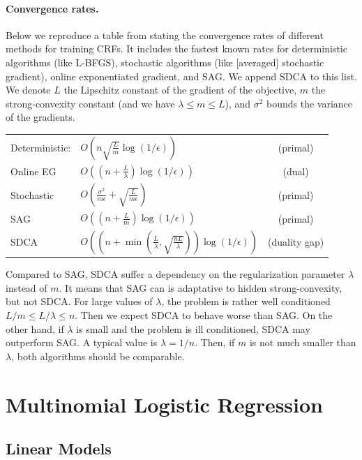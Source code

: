 \documentclass{article}
\DeclareMathOperator{\1}{\mathbb{1}}
\begin{document}
\paragraph{Convergence rates.}
Below we reproduce a table from \cite{schmidt_non-uniform_2015}stating the convergence rates of different methods for training CRFs.
It includes the fastest known rates for deterministic algorithms (like L-BFGS), stochastic algorithms (like [averaged] stochastic gradient), online exponentiated gradient, and SAG.
We append SDCA to this list.
We denote $L$ the Lipschitz constant of the gradient of the objective, $m$ the strong-convexity constant (and we have $\lambda \leq m \leq L$), and $\sigma^2$ bounds the variance of the gradients.\\
\begin{center}
\begin{tabular}{llc}
Deterministic: & $O(n\sqrt{\frac{L}{m}}\log(1/\epsilon))$ & (primal)\\
Online EG & $O((n + \frac{L}{\lambda})\log(1/\epsilon))$ & (dual)\\
Stochastic & $O(\frac{\sigma^2}{m \epsilon}+\sqrt{\frac{L}{m \epsilon}})$ & (primal)\\
SAG & $O((n + \frac{L}{m})\log(1/\epsilon))$ & (primal) \\
SDCA & $O( (n + \min( \frac{L}{\lambda}, \sqrt{\frac{n L}{\lambda}}) ) \log(1/\epsilon) )$ & (duality gap)
\end{tabular}
\end{center}
Compared to SAG, SDCA suffer a dependency on the regularization parameter $\lambda$ instead of $m$.
It means that SAG can is adaptative to  hidden strong-convexity, but not SDCA.
For large values of $\lambda$, the problem is rather well  conditioned $L/m \leq L/\lambda \leq n$.
Then we expect SDCA to behave worse than SAG.
On the other hand, if $\lambda$ is small and the problem is ill conditioned, SDCA may outperform SAG.
A typical value is $\lambda=1/n$.
Then, if $m$ is not much smaller than $\lambda$, both algorithms should be comparable.

\section{Multinomial Logistic Regression}

\subsection{Linear Models}
\end{document}
